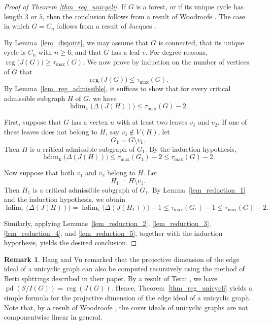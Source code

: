 \documentclass[12pt,amscd]{amsart}
\theoremstyle{definition}
\newtheorem{rem}[thm]{Remark}
\DeclareMathOperator{\hdim}{hdim}
\DeclareMathOperator{\reg}{reg}
\DeclareMathOperator{\pd}{pd}
\def\k {\mathrm k}
\begin{document}
\begin{proof}[Proof of Theorem \ref{thm_reg_unicycli}]
If $G$ is a forest, or if its unique cycle has length $3$ or $5$, then the conclusion follows from a result of Woodroofe \cite{W}. The case in which $G = C_n$ follows from a result of Jacques \cite{J}.

By Lemma~\ref{lem_disjoint}, we may assume that $G$ is connected, that its unique cycle is $C_n$ with $n \ge 6$, and that $G$ has a leaf $v$. For degree reasons, \( \reg\bigl(J(G)\bigr) \ge \tau_{\max}(G).
\) We now prove by induction on the number of vertices of $G$ that
\[
\reg\bigl(J(G)\bigr) \le \tau_{\max}(G).
\]
By Lemma~\ref{lem_reg_admissible}, it suffices to show that for every critical admissible subgraph $H$ of $G$, we have
\[
\hdim_{\k}\bigl(\Delta(J(H))\bigr)
\le
\tau_{\max}(G) - 2.
\]

First, suppose that $G$ has a vertex $u$ with at least two leaves $v_1$ and $v_2$. If one of these leaves does not belong to $H$, say $v_1 \notin V(H)$, let
\[
G_1 = G \setminus v_1.
\]
Then $H$ is a critical admissible subgraph of $G_1$. By the induction hypothesis,
\[
\hdim_{\k}\bigl(\Delta(J(H))\bigr)
\le
\tau_{\max}(G_1) - 2
\le
\tau_{\max}(G) - 2.
\]

Now suppose that both $v_1$ and $v_2$ belong to $H$. Let
\[
H_1 = H \setminus v_1.
\]
Then $H_1$ is a critical admissible subgraph of $G_1$. By Lemma~\ref{lem_reduction_1} and the induction hypothesis, we obtain
\[
\hdim_{\k}\bigl(\Delta(J(H))\bigr)
=
\hdim_{\k}\bigl(\Delta(J(H_1))\bigr) + 1
\le
\tau_{\max}(G_1) - 1
\le
\tau_{\max}(G) - 2.
\]

Similarly, applying Lemmas~\ref{lem_reduction_2}, \ref{lem_reduction_3}, \ref{lem_reduction_4}, and \ref{lem_reduction_5}, together with the induction hypothesis, yields the desired conclusion.
\end{proof}

\begin{rem}
Hang and Vu \cite{HaV} remarked that the projective dimension of the edge ideal of a unicyclic graph can also be computed recursively using the method of Betti splittings described in their paper. By a result of Terai \cite{T}, we have
\(\pd(S/I(G)) = \reg(J(G)).\) Hence, Theorem~\ref{thm_reg_unicycli} yields a simple formula for the projective dimension of the edge ideal of a unicyclic graph. Note that, by a result of Woodroofe \cite{W}, the cover ideals of unicyclic graphs are not componentwise linear in general.
\end{rem}
\end{document}
